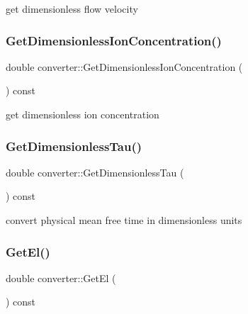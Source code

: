 get dimensionless flow velocity 

\mbox{\label{classconverter_aa856f42e3c480e1c0132fbd83c2b95e2}} 
\subsubsection{\texorpdfstring{Get\+Dimensionless\+Ion\+Concentration()}{GetDimensionlessIonConcentration()}}
{\footnotesize\ttfamily double converter\+::\+Get\+Dimensionless\+Ion\+Concentration (\begin{DoxyParamCaption}{ }\end{DoxyParamCaption}) const}



get dimensionless ion concentration 

\mbox{\label{classconverter_ac72a868ef0a7141d08db58a5cdb27c58}} 
\subsubsection{\texorpdfstring{Get\+Dimensionless\+Tau()}{GetDimensionlessTau()}}
{\footnotesize\ttfamily double converter\+::\+Get\+Dimensionless\+Tau (\begin{DoxyParamCaption}{ }\end{DoxyParamCaption}) const}



convert physical mean free time in dimensionless units 

\mbox{\label{classconverter_a9d68bca358ad6090dbdac200c94c251b}} 
\subsubsection{\texorpdfstring{Get\+El()}{GetEl()}}
{\footnotesize\ttfamily double converter\+::\+Get\+El (\begin{DoxyParamCaption}{ }\end{DoxyParamCaption}) const}



